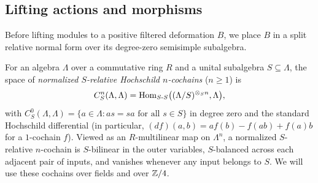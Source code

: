 \subsection{Lifting actions and morphisms}

Before lifting modules to a positive filtered deformation $B$, we place $B$
in a split relative normal form over its degree-zero semisimple subalgebra.

For an algebra $\Lambda$ over a commutative ring $R$ and a unital subalgebra
$S\subseteq\Lambda$, the space of \emph{normalized $S$-relative Hochschild
$n$-cochains} ($n\geq1$) is
\begin{equation}
 C^n_S(\Lambda,\Lambda)
   =\operatorname{Hom}_{S\text{-}S}\bigl((\Lambda/S)^{\otimes_S n},\Lambda\bigr),
 \label{eq:normalized-relative-cochains}
\end{equation}
with $C^0_S(\Lambda,\Lambda)=\{a\in\Lambda:as=sa\text{ for all }s\in S\}$
in degree zero and the standard Hochschild differential (in particular,
$(df)(a,b)=af(b)-f(ab)+f(a)b$ for a $1$-cochain $f$). Viewed as an
$R$-multilinear map on $\Lambda^n$, a normalized $S$-relative $n$-cochain is
$S$-bilinear in the outer variables, $S$-balanced across each adjacent pair
of inputs, and vanishes whenever any input belongs to $S$. We will use these
cochains over fields and over $\mathbb Z/4$.

